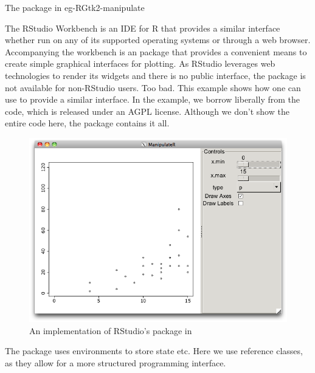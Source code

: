 \begin{example}{The  package in }{eg-RGtk2-manipulate}

The RStudio\texttrademark{} Workbench is an IDE for R that provides a
similar interface whether run on any of its supported operating
systems or through a web browser. Accompanying the workbench is an
\R{} package  that provides a convenient means to
create simple graphical interfaces for plotting. As RStudio leverages
web technologies to render its widgets and there is no public
interface, the package is not available for non-RStudio users. Too
bad. This example shows how one can use  to provide a
similar interface. In the example, we borrow liberally from the
 code, which is released under an AGPL
license. Although we don't show the entire code here, the
 package contains it all.

\begin{figure}
  \centering
  \includegraphics[width=.8\textwidth]{fig-RGtk2-manipulate.png}
  \caption{An implementation of RStudio's  package in }
  \label{fig:RGtk2-manipulate}
\end{figure}



The  package uses environments to store state
etc. Here we use reference classes, as they allow for a more
structured programming interface. 


\end{example}
